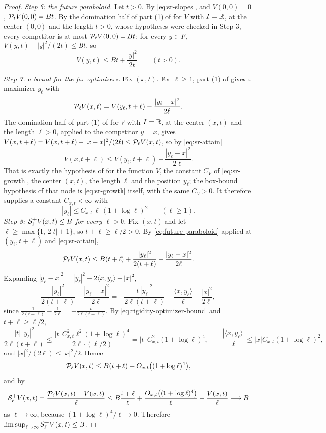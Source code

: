 \begin{proof}
\emph{Step 6: the future paraboloid.}
Let $t>0$. By \eqref{eq:sr-slopes},  and $V(0,0)=0$,
$\mathcal{P}_tV(0,0)=Bt$. By the domination half of part (1) of
 for $V$ with $I=\mathbb{R}$, at the center $(0,0)$
and the length $t>0$, whose hypotheses were checked in Step 3, every competitor
is at most $\mathcal{P}_tV(0,0)=Bt$: for every $y\in F$,
$V(y,t)-|y|^2/(2t)\le Bt$, so
\begin{equation}\label{eq:future-paraboloid}
  V(y,t)\le Bt+\frac{|y|^2}{2t}\qquad(t>0).
\end{equation}

\emph{Step 7: a bound for the far optimizers.}
Fix $(x,t)$. For $\ell\ge1$, part (1) of  gives a
maximizer $y_\ell$ with
\begin{equation}\label{eq:sr-attain}
  \mathcal{P}_\ell V(x,t)=V(y_\ell,t+\ell)-\frac{|y_\ell-x|^2}{2\ell}.
\end{equation}
The domination half of part (1) of  for $V$
with $I=\mathbb{R}$, at the center $(x,t)$ and the length $\ell>0$, applied to the
competitor $y=x$, gives
$V(x,t+\ell)=V(x,t+\ell)-|x-x|^2/(2\ell)\le\mathcal{P}_\ell V(x,t)$, so by
\eqref{eq:sr-attain}
\[
  V(x,t+\ell)\le V(y_\ell,t+\ell)-\frac{|y_\ell-x|^2}{2\ell} .
\]
That is exactly the hypothesis of  for the function
$V$, the constant $C_V$ of \eqref{eq:sr-growth}, the center $(x,t)$, the length
$\ell$ and the position $y_\ell$; the box-bound hypothesis of that node is
\eqref{eq:sr-growth} itself, with the same $C_V>0$. It therefore supplies a
constant $C_{x,t}<\infty$ with
\begin{equation}\label{eq:rigidity-optimizer-bound}
  |y_\ell|\le C_{x,t}\,\ell\,(1+\log\ell)^2\qquad(\ell\ge1).
\end{equation}
\emph{Step 8: $\mathcal{S}_\ell^+V(x,t)\le B$ for every $\ell>0$.}
Fix $(x,t)$ and let $\ell\ge\max\{1,\,2|t|+1\}$, so $t+\ell\ge\ell/2>0$. By
\eqref{eq:future-paraboloid} applied at $(y_\ell,t+\ell)$ and
\eqref{eq:sr-attain},
\[
  \mathcal{P}_\ell V(x,t)\le B(t+\ell)
    +\frac{|y_\ell|^2}{2(t+\ell)}-\frac{|y_\ell-x|^2}{2\ell}.
\]
Expanding $|y_\ell-x|^2=|y_\ell|^2-2\langle x,y_\ell\rangle+|x|^2$,
\[
  \frac{|y_\ell|^2}{2(t+\ell)}-\frac{|y_\ell-x|^2}{2\ell}
   =-\frac{t\,|y_\ell|^2}{2\ell(t+\ell)}
     +\frac{\langle x,y_\ell\rangle}{\ell}-\frac{|x|^2}{2\ell},
\]
since $\tfrac1{2(t+\ell)}-\tfrac1{2\ell}=-\tfrac{t}{2\ell(t+\ell)}$. By
\eqref{eq:rigidity-optimizer-bound} and $t+\ell\ge\ell/2$,
\[
  \frac{|t|\,|y_\ell|^2}{2\ell(t+\ell)}
   \le\frac{|t|\,C_{x,t}^2\ell^2(1+\log\ell)^4}{2\ell\cdot(\ell/2)}
   =|t|\,C_{x,t}^2(1+\log\ell)^4,
  \qquad
  \frac{|\langle x,y_\ell\rangle|}{\ell}\le|x|C_{x,t}(1+\log\ell)^2,
\]
and $|x|^2/(2\ell)\le|x|^2/2$. Hence
\[
  \mathcal{P}_\ell V(x,t)\le B(t+\ell)+O_{x,t}\bigl((1+\log\ell)^4\bigr),
\]
and by 
\[
  \mathcal{S}_\ell^+V(x,t)=\frac{\mathcal{P}_\ell V(x,t)-V(x,t)}{\ell}
   \le B\frac{t+\ell}{\ell}+\frac{O_{x,t}\bigl((1+\log\ell)^4\bigr)}{\ell}
     -\frac{V(x,t)}{\ell}\longrightarrow B
\]
as $\ell\to\infty$, because $(1+\log\ell)^4/\ell\to0$. Therefore
$\limsup_{\ell\to\infty}\mathcal{S}_\ell^+V(x,t)\le B$.


\end{proof}

